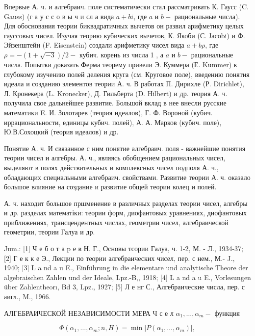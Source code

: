\documentclass[10pt]{article}
\begin{document}
Впервые А. ч. и алгебраич. поле систематически стал рассматривать К. Гаусс (C. Gauss) (г а у с с о в ы ч и сл а вида $a+b i$, где $a$ и $b-$ рациональные числа). Для обоснования теории биквадратичных вычетов он развил арифметику целых гауссовых чисел. Изучая теорию кубических вычетов, К. Якоби (С. Јасоbi) и Ф. Эйзенштейн (F. Eisenstein) создали арифметику чисел вида $a+b \rho$, где $\rho=-(1+\sqrt{-3}) / 2-$ кубич. корень из числа 1 , а $a$ и $b-$ рациональные числа. Попытки доказать Ферма теорему привели Э. Куммера (Е. Kummer) к глубокому изучению полей деления круга (см. Круговое поле), введению понятия идеала и созданию элементов теории А. ч. В работах П. Дирихле (Р. Dirichlet), Л. Кронекера (L. Kronecker), Д. Гильберта (D. Hilbert) и др. теория А. ч. получила свое дальнейшее развитие. Большой вклад в нее внесли русские математики E. И. Золотарев (теория идеалов), Г. Ф. Вороной (кубич. иррациональности, единицы кубич. полей), А. А. Марков (кубич. поле), Ю.В.Сохоцкий (теория идеалов) и др.



Понятие А. ч. И связанное с ним понятие алгебраич. поля - важнейшие понятия теории чисел и алгебры. А. ч., являясь обобщением рациональных чисел, выделяют в полях действительных и комплексных чисел подполя А. ч., обладающих специальными алгебраич. свойствами. Развитие теории А. ч. оказало большое влияние на создание и развитие общей теории колец и полей.



А. ч. находит большое пршменение в различных разделах теории чисел, алгебры и др. разделах математіки: теории форм, диофантовых уравнениях, диофантовых приближениях, трансцендентных числах, геометрии чисел, алгебраической геометрии, теории Галуа и др.



Jum.: [1] Ч е б о т а p е в Н. Г., Основы тсории Галуа, ч. 1-2, М. - Л., 1934-37; [2] Г е к к е Э., Лекции по теории алгебраических чисел, пер. с нем., М.- J., 1940; [3] L a nd a u E., Einführung in die elementare und analytische Theore der algebraischen Zahlen und der Ideale, Lpz.-B,, 1918; [4] L a nd a u E., Vorlesungen über Zahlentheorı, Bd 3, Lpz., 1927; [5] Л е нг С., Алгебраические числа, пер. с аигл., M., 1966.



АЛГЕБРАИЧЕСКОЙ НЕЗАВИСИМОСТИ МЕРА Ч с е л $\alpha_{1}, \ldots, \alpha_{m}-$ функция



\[

\Phi\left(\alpha_{1}, \ldots, \alpha_{m} ; n, H\right)=\min \left|P\left(\alpha_{1}, \ldots, \alpha_{m}\right)\right|,

\]
\end{document}
